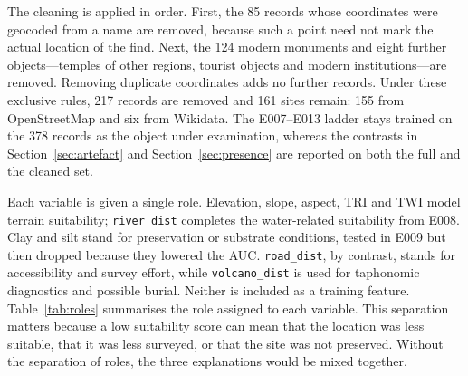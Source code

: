 \documentclass[12pt]{article}
\begin{document}
The cleaning is applied in order.
First, the 85 records whose coordinates were geocoded from a name are removed, because such a point need not mark the actual location of the find.
Next, the 124 modern monuments and eight further objects---temples of other regions, tourist objects and modern institutions---are removed.
Removing duplicate coordinates adds no further records.
Under these exclusive rules, 217 records are removed and 161 sites remain: 155 from OpenStreetMap and six from Wikidata.
The E007--E013 ladder stays trained on the 378 records as the object under examination, whereas the contrasts in Section~\ref{sec:artefact} and Section~\ref{sec:presence} are reported on both the full and the cleaned set.

Each variable is given a single role.
Elevation, slope, aspect, TRI and TWI model terrain suitability; \texttt{river\_dist} completes the water-related suitability from E008.
Clay and silt stand for preservation or substrate conditions, tested in E009 but then dropped because they lowered the AUC.
\texttt{road\_dist}, by contrast, stands for accessibility and survey effort, while \texttt{volcano\_dist} is used for taphonomic diagnostics and possible burial.
Neither is included as a training feature.
Table~\ref{tab:roles} summarises the role assigned to each variable.
This separation matters because a low suitability score can mean that the location was less suitable, that it was less surveyed, or that the site was not preserved.
Without the separation of roles, the three explanations would be mixed together.
\end{document}
